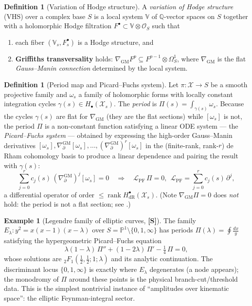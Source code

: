 \documentclass[12pt]{article}
\theoremstyle{definition}
\newtheorem{definition}[theorem]{Definition}
\newtheorem{example}[theorem]{Example}
\theoremstyle{remark}
\newcommand{\QQ}{\mathbb{Q}}
\newcommand{\PP}{\mathbb{P}}
\newcommand{\Ohm}{\mathcal{O}}
\newcommand{\rk}{\operatorname{rank}}
\newcommand{\GM}{\nabla_{\mathrm{GM}}}
\newcommand{\GMd}{\nabla^{\mathrm{GM}}_{\partial}}
\newcommand{\Fil}{F^{\bullet}}
\newcommand{\status}[1]{\textnormal{\textsf{\textbf{[#1]}}}}
\begin{document}
\begin{definition}[Variation of Hodge structure]
\label{def:vhs}
A \emph{variation of Hodge structure} (VHS) over a complex base $S$ is a local system $\mathbb V$ of
$\QQ$-vector spaces on $S$ together with a holomorphic Hodge filtration $\Fil\subset \mathbb
V\otimes\Ohm_S$ such that
\begin{enumerate}
  \item each fiber $(\mathbb V_s,F^\bullet_s)$ is a Hodge structure, and
  \item \textbf{Griffiths transversality} holds: $\GM F^p \subseteq F^{p-1}\otimes\Omega^1_S$, where
  $\GM$ is the flat \emph{Gauss--Manin connection} determined by the local system.
\end{enumerate}
\end{definition}

\begin{definition}[Period map and Picard--Fuchs system]
\label{def:pf}
Let $\pi\colon\mathcal X\to S$ be a smooth projective family and $\omega_s$ a family of holomorphic
forms with locally constant integration cycles $\gamma(s)\in H_\bullet(\mathcal X_s)$. The
\emph{period} is $\Pi(s)=\int_{\gamma(s)}\omega_s$. Because the cycles $\gamma(s)$ are flat for $\GM$
(they are the flat sections) while $[\omega_s]$ is not, the period $\Pi$ is a non-constant function
satisfying a linear ODE system --- the \emph{Picard--Fuchs system} --- obtained by expressing the
high-order Gauss--Manin derivatives $[\omega_s],\GMd[\omega_s],\dots,(\GMd)^r[\omega_s]$ in the
(finite-rank, rank-$r$) de Rham cohomology basis to produce a linear dependence and pairing the result
with $\gamma(s)$:
\[
  \sum_{j=0}^{r} c_j(s)\,(\GMd)^j[\omega_s] = 0
  \quad\Longrightarrow\quad
  \mathcal L_{\mathrm{PF}}\,\Pi = 0,\ \ \mathcal L_{\mathrm{PF}}=\sum_{j=0}^r c_j(s)\,\partial^j,
\]
a differential operator of order $\le \rk H^\bullet_{\mathrm{dR}}(\mathcal X_s)$. (Note $\GM\Pi=0$ does
\emph{not} hold: the period is not a flat section; see .)
\end{definition}

\begin{example}[Legendre family of elliptic curves, \status{S}]
\label{ex:legendre}
The family $E_\lambda\colon y^2 = x(x-1)(x-\lambda)$ over $S=\PP^1\setminus\{0,1,\infty\}$ has periods
$\Pi(\lambda)=\oint \frac{dx}{y}$ satisfying the hypergeometric Picard--Fuchs equation
\[
  \lambda(1-\lambda)\,\Pi'' + (1-2\lambda)\,\Pi' - \tfrac14\,\Pi = 0,
\]
whose solutions are ${}_2F_1(\tfrac12,\tfrac12;1;\lambda)$ and its analytic continuation. The
discriminant locus $\{0,1,\infty\}$ is exactly where $E_\lambda$ degenerates (a node appears); the
monodromy of $\Pi$ around these points is the physical branch-cut/threshold data. This is the simplest
nontrivial instance of ``amplitudes over kinematic space'': the elliptic Feynman-integral sector.
\end{example}
\end{document}
